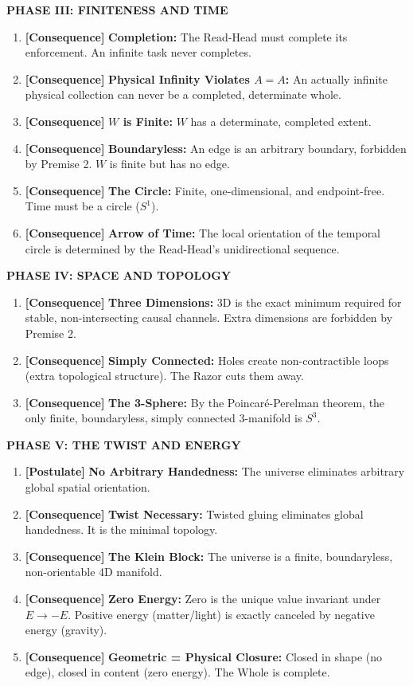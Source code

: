 \documentclass[11pt]{article}
\theoremstyle{canonstyle}
\providecommand{\Sone}{S^1}
\providecommand{\Sthree}{S^3}
\begin{document}
\textbf{PHASE III: FINITENESS AND TIME}
\begin{enumerate}[resume]
    \item \textbf{[Consequence]} \textbf{Completion:} The Read-Head must complete its enforcement. An infinite task never completes.
    \item \textbf{[Consequence]} \textbf{Physical Infinity Violates $A=A$:} An actually infinite physical collection can never be a completed, determinate whole.
    \item \textbf{[Consequence]} \textbf{$W$ is Finite:} $W$ has a determinate, completed extent.
    \item \textbf{[Consequence]} \textbf{Boundaryless:} An edge is an arbitrary boundary, forbidden by Premise 2. $W$ is finite but has no edge.
    \item \textbf{[Consequence]} \textbf{The Circle:} Finite, one-dimensional, and endpoint-free. Time must be a circle ($\Sone$).
    \item \textbf{[Consequence]} \textbf{Arrow of Time:} The local orientation of the temporal circle is determined by the Read-Head's unidirectional sequence.
\end{enumerate}

\newpage
\textbf{PHASE IV: SPACE AND TOPOLOGY}
\begin{enumerate}[resume]
    \item \textbf{[Consequence]} \textbf{Three Dimensions:} 3D is the exact minimum required for stable, non-intersecting causal channels. Extra dimensions are forbidden by Premise 2.
    \item \textbf{[Consequence]} \textbf{Simply Connected:} Holes create non-contractible loops (extra topological structure). The Razor cuts them away.
    \item \textbf{[Consequence]} \textbf{The 3-Sphere:} By the Poincaré-Perelman theorem, the only finite, boundaryless, simply connected 3-manifold is $\Sthree$.
\end{enumerate}

\textbf{PHASE V: THE TWIST AND ENERGY}
\begin{enumerate}[resume]
    \item \textbf{[Postulate]} \textbf{No Arbitrary Handedness:} The universe eliminates arbitrary global spatial orientation.
    \item \textbf{[Consequence]} \textbf{Twist Necessary:} Twisted gluing eliminates global handedness. It is the minimal topology.
    \item \textbf{[Consequence]} \textbf{The Klein Block:} The universe is a finite, boundaryless, non-orientable 4D manifold.
    \item \textbf{[Consequence]} \textbf{Zero Energy:} Zero is the unique value invariant under $E \to -E$. Positive energy (matter/light) is exactly canceled by negative energy (gravity).
    \item \textbf{[Consequence]} \textbf{Geometric = Physical Closure:} Closed in shape (no edge), closed in content (zero energy). The Whole is complete.
\end{enumerate}
\end{document}
